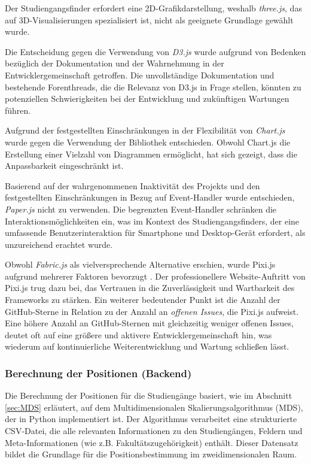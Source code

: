 Der Studiengangsfinder erfordert eine 2D-Grafikdarstellung, weshalb
\textit{three.js}, das auf 3D-Visualisierungen spezialisiert ist, nicht als
geeignete Grundlage gewählt wurde. \parencite{threejs}

Die Entscheidung gegen die Verwendung von \textit{D3.js} wurde aufgrund
von Bedenken bezüglich der Dokumentation und der Wahrnehmung in der 
Entwicklergemeinschaft getroffen. Die unvollständige Dokumentation und
bestehende Forenthreads, die die Relevanz von D3.js in Frage stellen, könnten zu
potenziellen Schwierigkeiten bei der Entwicklung und zukünftigen Wartungen
führen. \parencite{d3js}


Aufgrund der festgestellten Einschränkungen in der Flexibilität von
\textit{Chart.js} wurde gegen die Verwendung der Bibliothek entschieden. Obwohl
Chart.js die Erstellung einer Vielzahl von Diagrammen ermöglicht, hat sich
gezeigt, dass die Anpassbarkeit eingeschränkt ist. \parencite{chartjs}

Basierend auf der wahrgenommenen Inaktivität des Projekts und den festgestellten 
Einschränkungen in Bezug auf Event-Handler wurde entschieden, \textit{Paper.js}
nicht zu verwenden. \parencite{paperjs} Die begrenzten Event-Handler schränken
die Interaktionsmöglichkeiten ein, was im Kontext des Studiengangsfinders, der
eine umfassende Benutzerinteraktion für Smartphone und Desktop-Gerät erfordert,
als unzureichend erachtet wurde. \parencite{paperjs-events}

Obwohl \textit{Fabric.js} als vielversprechende Alternative erschien, wurde
Pixi.js aufgrund mehrerer Faktoren bevorzugt \parencite{fabricjs}. Der
professionellere Website-Auftritt von Pixi.js trug dazu bei, das Vertrauen in
die Zuverlässigkeit und Wartbarkeit des Frameworks zu stärken. Ein weiterer
bedeutender Punkt ist die Anzahl der GitHub-Sterne in Relation zu der Anzahl an
\textit{offenen Issues}, die Pixi.js aufweist. Eine höhere Anzahl an
GitHub-Sternen mit gleichzeitig weniger offenen Issues, deutet oft auf eine
größere und aktivere Entwicklergemeinschaft hin, was wiederum auf
kontinuierliche Weiterentwicklung und Wartung schließen lässt.
\parencite{paperjs-pixijs-comparison}

\subsubsection{Berechnung der Positionen (Backend)}
Die Berechnung der Positionen für die Studiengänge basiert, wie im Abschnitt
\ref{sec:MDS} erläutert, auf dem Multidimensionalen Skalierungsalgorithmus
(MDS), der in Python implementiert ist. Der Algorithmus verarbeitet eine
strukturierte CSV-Datei, die alle relevanten Informationen zu den Studiengängen,
Feldern und Meta-Informationen (wie z.B. Fakultätszugehörigkeit) enthält. Dieser
Datensatz bildet die Grundlage für die Positionsbestimmung im zweidimensionalen
Raum.

